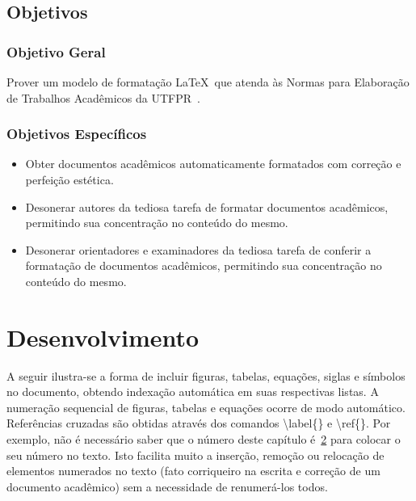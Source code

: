 \documentclass[openright]{normas-utf-tex} %
\begin{document}
\section{Objetivos}
\label{sec:objetivos}

\subsection{Objetivo Geral}
\label{subsec:objetivoGeral}

Prover um modelo de formatação \LaTeX\ que atenda às Normas para Elaboração de Trabalhos Acadêmicos da UTFPR~\cite{UTFPR2008}.

\subsection{Objetivos Específicos}
\label{subsec:objetivosEspecificos}

\begin{itemize}
	\item Obter documentos acadêmicos automaticamente formatados com correção e perfeição estética.
	\item Desonerar autores da tediosa tarefa de formatar documentos acadêmicos, permitindo sua concentração no conteúdo do mesmo.
	\item Desonerar orientadores e examinadores da tediosa tarefa de conferir a formatação de documentos acadêmicos, permitindo sua concentração no conteúdo do mesmo.
\end{itemize}



\chapter{Desenvolvimento}
\label{chap:desenv}

A seguir ilustra-se a forma de incluir figuras, tabelas, equações, siglas e símbolos no documento, obtendo indexação automática em suas respectivas listas. A numeração sequencial de figuras, tabelas e equações ocorre de modo automático. Referências cruzadas são obtidas através dos comandos {\ttfamily \textbackslash label\{\}} e {\ttfamily \textbackslash ref\{\}}. Por exemplo, não é necessário saber que o número deste capítulo é~\ref{chap:desenv} para colocar o seu número no texto. Isto facilita muito a inserção, remoção ou relocação de elementos numerados no texto (fato corriqueiro na escrita e correção de um documento acadêmico) sem a necessidade de renumerá-los todos.
\end{document}
